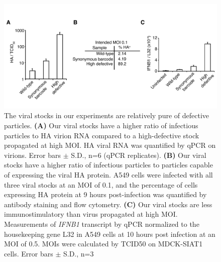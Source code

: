 \documentclass[9pt,lineno]{elife}
\begin{document}
\begin{figure}
\centerline{\includegraphics[width=0.7\linewidth]{figures/Validating_barcode_virus/validating_populations_D02.pdf}}
\caption{\label{fig:viruspopulations} The viral stocks in our experiments are relatively pure of defective particles. 
{\bf (A)}
Our viral stocks have a higher ratio of infectious particles to HA virion RNA compared to a high-defective stock propagated at high MOI.
HA viral RNA was quantified by qPCR on virions. 
Error bars $\pm$ S.D., n=6 (qPCR replicates). 
{\bf (B)} 
Our viral stocks have a higher ratio of infectious particles to particles capable of expressing the viral HA protein.
A549 cells were infected with all three viral stocks at an MOI of 0.1, and the percentage of cells expressing HA protein at 9 hours post-infection was quantified by antibody staining and flow cytometry.
{\bf (C)} 
Our viral stocks are less immunostimulatory than virus propagated at high MOI. 
Measurements of \textit{IFNB1} transcript by qPCR normalized to the housekeeping gene L32 in A549 cells at 10 hours post infection at an MOI of 0.5.
MOIs were calculated by TCID50 on MDCK-SIAT1 cells.
Error bars $\pm$ S.D., n=3}
\end{figure}
\end{document}
